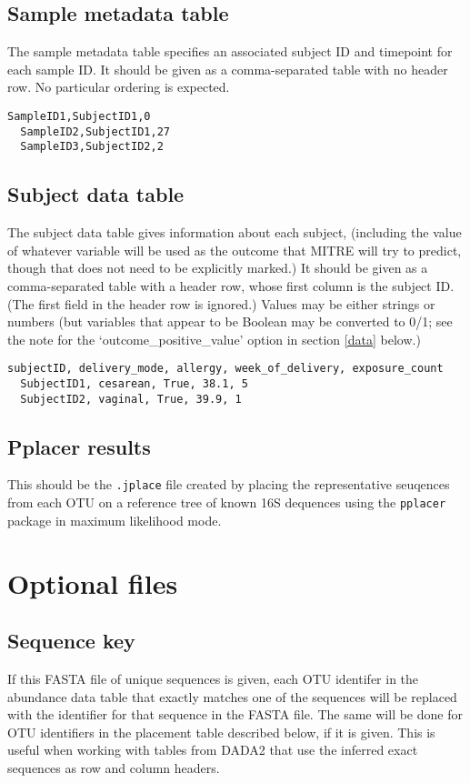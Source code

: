 \documentclass[12pt]{report}
\begin{document}
\subsection{Sample metadata table}\label{sample_metadata}
The sample metadata table specifies an associated subject ID and
timepoint for each sample ID. It should be given as a comma-separated
table with no header row. No particular ordering is expected.
\begin{lstlisting}[caption=Example sample metadata table]
  SampleID1,SubjectID1,0
  SampleID2,SubjectID1,27
  SampleID3,SubjectID2,2
\end{lstlisting}

\subsection{Subject data table}\label{subject_data}
The subject data table gives information about each subject,
(including the value of whatever variable will be used as the outcome
that MITRE will try to predict, though that does not need to be
explicitly marked.) It should be given as a comma-separated table with
a header row, whose first column is the subject ID. (The first field
in the header row is ignored.) Values may be either strings or numbers
(but variables that appear to be Boolean may be converted to 0/1; see
the note for the `outcome\_positive\_value' option in section
\ref{data} below.)
\begin{lstlisting}[caption=Example subject data table]
  subjectID, delivery_mode, allergy, week_of_delivery, exposure_count
  SubjectID1, cesarean, True, 38.1, 5
  SubjectID2, vaginal, True, 39.9, 1
\end{lstlisting}

\subsection{Pplacer results}\label{jplace_file}
This should be the \texttt{.jplace} file created by placing the
representative seuqences from each OTU on a reference tree of known
16S dequences using the \texttt{pplacer} package in maximum likelihood
mode.

\section{Optional files}
\subsection{Sequence key}\label{sequence_key}
If this FASTA file of unique sequences is given, each OTU identifer in
the abundance data table that exactly matches one of the sequences
will be replaced with the identifier for that sequence in the FASTA
file. The same will be done for OTU identifiers in the placement table
described below, if it is given. This is useful when working with
tables from DADA2 that use the inferred exact sequences as
row and column headers.
\end{document}
